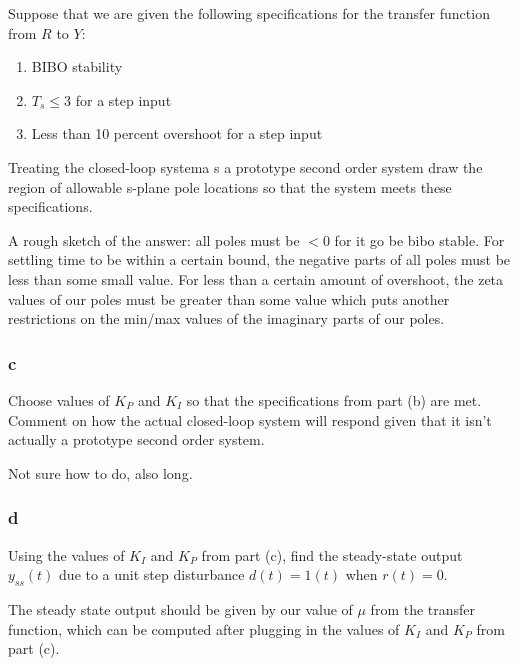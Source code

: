\documentclass[11pt]{article}
\begin{document}
Suppose that we are given the following specifications for the transfer function from $R$ to $Y$:

\begin{enumerate}
    \item BIBO stability
    \item $T_s \leq 3$ for a step input
    \item Less than 10 percent overshoot for a step input
\end{enumerate}

Treating the closed-loop systema s a prototype second order system draw the region of allowable s-plane pole locations so that the system meets these specifications.

A rough sketch of the answer: all poles must be $< 0$ for it go be bibo stable. For settling time to be within a certain bound, the negative parts of all poles must be less than some small value. For less than a certain amount of overshoot, the zeta values of our poles must be greater than some value which puts another restrictions on the min/max values of the imaginary parts of our poles.

\subsubsection{c}

Choose values of $K_P$ and $K_I$ so that the specifications from part (b) are met. Comment on how the actual closed-loop system will respond given that it isn't actually a prototype second order system.

Not sure how to do, also long.

\subsubsection{d}

Using the values of $K_I$ and $K_P$ from part (c), find the steady-state output $y_{ss}(t)$ due to a unit step disturbance $d(t) = 1(t)$ when $r(t) = 0$.

The steady state output should be given by our value of $\mu$ from the transfer function, which can be computed after plugging in the values of $K_I$ and $K_P$ from part (c).
\end{document}
